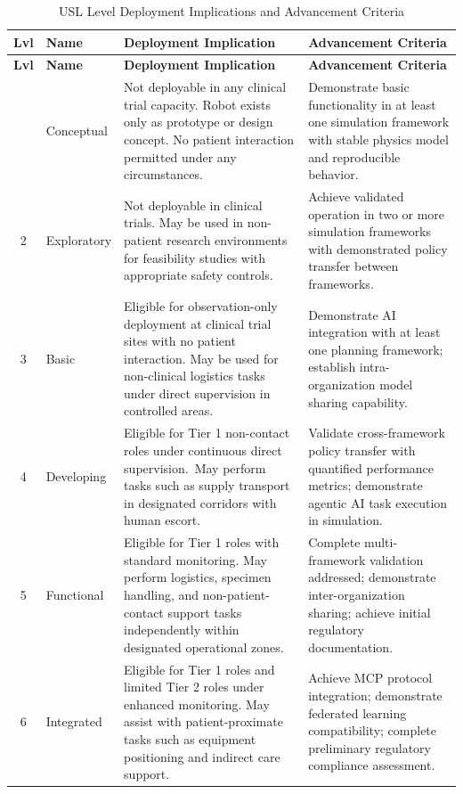 \begin{longtable}{c l p{6cm} p{6cm}}
\caption{USL Level Deployment Implications and Advancement Criteria}
\label{tab:usl-level-implications} \\
\toprule
\textbf{Lvl} & \textbf{Name} & \textbf{Deployment Implication} & \textbf{Advancement Criteria} \\
\midrule
\endfirsthead
\toprule
\textbf{Lvl} & \textbf{Name} & \textbf{Deployment Implication} & \textbf{Advancement Criteria} \\
\midrule
\endhead
\bottomrule
\endfoot
1 & Conceptual & Not deployable in any clinical trial capacity. Robot exists only as prototype or design concept. No patient interaction permitted under any circumstances. & Demonstrate basic functionality in at least one simulation framework with stable physics model and reproducible behavior. \\
2 & Exploratory & Not deployable in clinical trials. May be used in non-patient research environments for feasibility studies with appropriate safety controls. & Achieve validated operation in two or more simulation frameworks with demonstrated policy transfer between frameworks. \\
3 & Basic & Eligible for observation-only deployment at clinical trial sites with no patient interaction. May be used for non-clinical logistics tasks under direct supervision in controlled areas. & Demonstrate AI integration with at least one planning framework; establish intra-organization model sharing capability. \\
4 & Developing & Eligible for Tier 1 non-contact roles under continuous direct supervision.\ May perform tasks such as supply transport in designated corridors with human escort. & Validate cross-framework policy transfer with quantified performance metrics; demonstrate agentic AI task execution in simulation. \\
5 & Functional & Eligible for Tier 1 roles with standard monitoring. May perform logistics, specimen handling, and non-patient-contact support tasks independently within designated operational zones. & Complete multi-framework validation addressed; demonstrate inter-organization sharing; achieve initial regulatory documentation. \\
6 & Integrated & Eligible for Tier 1 roles and limited Tier 2 roles under enhanced monitoring. May assist with patient-proximate tasks such as equipment positioning and indirect care support. & Achieve MCP protocol integration; demonstrate federated learning compatibility; complete preliminary regulatory compliance assessment. \\

\end{longtable}
